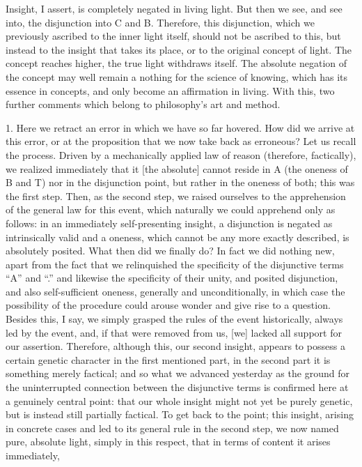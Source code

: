 Insight, I assert, is completely negated in living light.
But then we see, and see into, the disjunction into C and B.
Therefore, this disjunction, which we previously ascribed
to the inner light itself,
should not be ascribed to this,
but instead to the insight that takes its place,
or to the original concept of light.
The concept reaches higher,
the true light withdraws itself.
The absolute negation of the concept may well
remain a nothing for the science of knowing,
which has its essence in concepts,
and only become an affirmation in living.
With this, two further comments which belong
to philosophy's art and method.

1. Here we retract an error in which we have so far hovered.
How did we arrive at this error,
or at the proposition that
we now take back as erroneous?
Let us recall the process.
Driven by a mechanically applied law of reason
(therefore, factically),
we realized immediately that it [the absolute]
cannot reside in A (the oneness of B and T)
nor in the disjunction point,
but rather in the oneness of both;
this was the first step.
Then, as the second step,
we raised ourselves to the apprehension
of the general law for this event,
which naturally we could apprehend only as follows:
in an immediately self-presenting insight,
a disjunction is negated as intrinsically valid
and a oneness, which cannot be any more exactly described,
is absolutely posited.
What then did we finally do?
In fact we did nothing new,
apart from the fact that we relinquished
the specificity of the disjunctive terms “A” and “.”
and likewise the specificity of their unity,
and posited disjunction,
and also self-sufficient oneness,
generally and unconditionally,
in which case the possibility of the procedure
could arouse wonder and give rise to a question.
Besides this, I say, we simply grasped
the rules of the event historically,
always led by the event,
and, if that were removed from us,
[we] lacked all support for our assertion.
Therefore, although this, our second insight,
appears to possess a certain genetic character
in the first mentioned part,
in the second part it is something merely factical;
and so what we advanced yesterday as the
ground for the uninterrupted connection
between the disjunctive terms is
confirmed here at a genuinely central point:
that our whole insight might not yet be purely genetic,
but is instead still partially factical.
To get back to the point;
this insight, arising in concrete cases
and led to its general rule in the second step,
we now named pure, absolute light,
simply in this respect,
that in terms of content it arises immediately,
